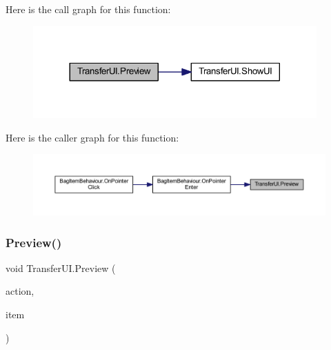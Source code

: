 Here is the call graph for this function\+:
\nopagebreak
\begin{figure}[H]
\begin{center}
\leavevmode
\includegraphics[width=308pt]{class_transfer_u_i_a9d2e7c3708193e3d51fe8539f9c41a75_cgraph}
\end{center}
\end{figure}
Here is the caller graph for this function\+:
\nopagebreak
\begin{figure}[H]
\begin{center}
\leavevmode
\includegraphics[width=350pt]{class_transfer_u_i_a9d2e7c3708193e3d51fe8539f9c41a75_icgraph}
\end{center}
\end{figure}
\mbox{\label{class_transfer_u_i_a52bd586cae27d6570e207d856457a116}} 
\subsubsection{\texorpdfstring{Preview()}{Preview()}\hspace{0.1cm}{\footnotesize\ttfamily [2/2]}}
{\footnotesize\ttfamily void Transfer\+U\+I.\+Preview (\begin{DoxyParamCaption}\item[{\mbox{\hyperlink{class_container_behaviour_a8ad6b6c9b34c2e0abdaaf0627f87b036}{Container\+Behaviour.\+Actions}}}]{action,  }\item[{\mbox{\hyperlink{class_base_item}{Base\+Item}}}]{item }\end{DoxyParamCaption})}

